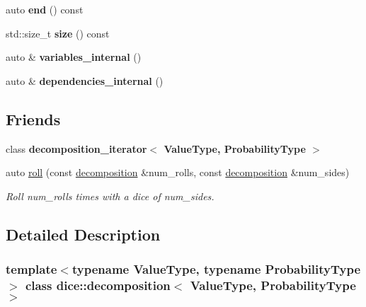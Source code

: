 \begin{DoxyCompactItemize}
$$auto {\bfseries end} () const
\item 
\mbox{\label{classdice_1_1decomposition_acf86c5c07f567d3ee95407e5c8dd788a}} 
std\+::size\+\_\+t {\bfseries size} () const
\item 
\mbox{\label{classdice_1_1decomposition_a986e5e2240ec1553cd2370d235e42a21}} 
auto \& {\bfseries variables\+\_\+internal} ()
\item 
\mbox{\label{classdice_1_1decomposition_ac68a42128dd2b20aa41a7826effd06a2}} 
auto \& {\bfseries dependencies\+\_\+internal} ()
\end{DoxyCompactItemize}
\subsection*{Friends}
\begin{DoxyCompactItemize}
\item 
\mbox{\label{classdice_1_1decomposition_a90f425f8bf994cdc21610c6926c41a92}} 
class {\bfseries decomposition\+\_\+iterator$<$ Value\+Type, Probability\+Type $>$}
\item 
auto \mbox{\hyperlink{classdice_1_1decomposition_a0c852d5e74d719a95d3056fb79e0a703}{roll}} (const \mbox{\hyperlink{classdice_1_1decomposition}{decomposition}} \&num\+\_\+rolls, const \mbox{\hyperlink{classdice_1_1decomposition}{decomposition}} \&num\+\_\+sides)
\begin{DoxyCompactList}\small\item\em Roll num\+\_\+rolls times with a dice of num\+\_\+sides. \end{DoxyCompactList}\end{DoxyCompactItemize}


\subsection{Detailed Description}
\subsubsection*{template$<$typename Value\+Type, typename Probability\+Type$>$\newline
class dice\+::decomposition$<$ Value\+Type, Probability\+Type $>$}

